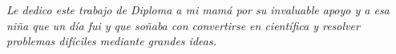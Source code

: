 \begin{dedication}
\textit{Le dedico este trabajo de Diploma a mi mam\'a por su invaluable apoyo y a esa ni\~na que un d\'ia fui y que so\~naba con convertirse en cient\'ifica y resolver problemas dif\'iciles mediante grandes ideas.}
\end{dedication}